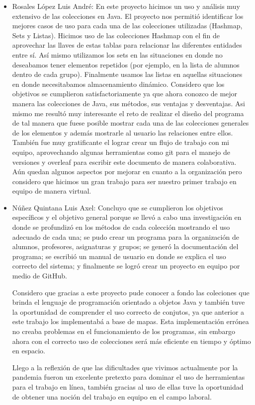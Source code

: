 \documentclass[12pt, letterpaper]{report}
\begin{document}
\begin{itemize}
  \item Rosales López Luis André: En este proyecto hicimos un uso y análisis muy extensivo de las colecciones en Java. El proyecto nos permitió identificar los mejores casos de uso para cada una de las colecciones utilizadas (Hashmap, Sets y Listas). Hicimos uso de las colecciones Hashmap con el fin de aprovechar las llaves de estas tablas para relacionar las diferentes entidades entre sí. Así mismo utilizamos los sets en las situaciones en donde no deseabamos
  tener elementos repetidos (por ejemplo, en la lista de alumnos dentro de cada grupo). Finalmente usamos las listas en aquellas situaciones en donde necesitabamos almacenamiento dinámico. Considero que los objetivos se cumplieron satisfactoriamente ya que ahora conozco de mejor manera las colecciones de Java, sus métodos, sus ventajas y desventajas. Asi mismo me resultó muy interesante el reto de realizar el diseño del programa de tal manera que fuese posible mostrar cada una de las colecciones generales de los elementos y además mostrarle al usuario las relaciones entre ellos. También fue muy gratificante el lograr crear un flujo de trabajo con mi equipo, aprovechando algunas herramientas como git para el manejo de versiones y overleaf para escribir este documento de manera colaborativa. Aún quedan algunos aspectos por mejorar en cuanto a la organización pero considero que hicimos un gran trabajo para ser nuestro primer trabajo en equipo de manera virtual.
 
  
  
  \item Núñez Quintana Luis Axel: Concluyo que se cumplieron los objetivos específicos y el objetivo general porque se llevó a cabo una investigación en donde se profundizó en los métodos de cada colección mostrando el uso adecuado de cada una; se pudo crear un programa para la organización de alumnos, profesores, asignaturas y grupos; se generó la documentación del programa; se escribió un manual de usuario en donde se explica el uso correcto del sistema; y finalmente se logró crear un proyecto en equipo por medio de GitHub.
  
  Considero que gracias a este proyecto pude conocer a fondo las coleciones que brinda el lenguaje de programación orientado a objetos Java y también tuve la oportunidad de comprender el uso correcto de conjutos, ya que anterior a este trabajo los implementabá a base de mapas. Esta implementación errónea no creaba problemas en el funcionamiento de los programas, sin embargo ahora con el correcto uso de colecciones será más eficiente en tiempo y óptimo en espacio.
  
  Llego a la reflexión de que las dificultades que vivimos actualmente por la pandemia fueron un excelente pretexto para dominar el uso de herramientas para el trabajo en línea, también gracias al uso de ellas tuve la oportunidad de obtener una noción del trabajo en equipo en el campo laboral.
\end{itemize}
\end{document}
